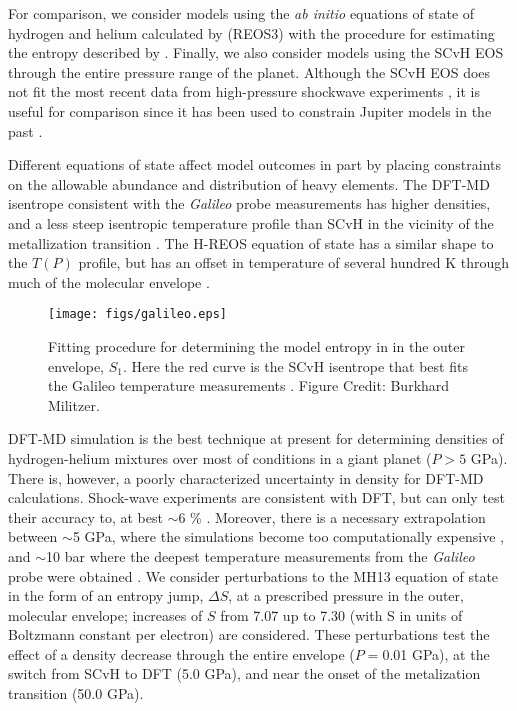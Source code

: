 For comparison, we consider  models using the \textit{ab initio} equations of
state of hydrogen and helium calculated by \citet{becker2013}(REOS3) with the
procedure for estimating the entropy described by \citet{miguel2016}. Finally,
we also consider models using the SCvH EOS through the entire pressure range of
the planet.  Although the SCvH EOS does not fit the most recent data from
high-pressure shockwave experiments \citep{hubbard2016,miguel2016}, it is 
useful for comparison since it has been used to constrain Jupiter models
in the past \citep[e.g.][]{Saumon2004}.  

Different equations of state affect model outcomes in part by placing
constraints on the allowable abundance and distribution of heavy elements. The
DFT-MD isentrope consistent with the \textit{Galileo} probe measurements has
higher densities, and a less steep isentropic temperature profile than SCvH in
the vicinity of the metallization transition
\citep{militzer2013a,militzer2016}. The H-REOS equation of state has a similar
shape to the $T(P)$ profile, but has an offset in temperature of several
hundred K through much of the molecular envelope
\citep{Nettelmann2012,hubbard2016,miguel2016}. 

\begin{figure}[h]
  \begin{center}
    \noindent\texttt{[image: figs/galileo.eps]}
  \end{center}
  \caption{ Fitting procedure for determining the model entropy in in the outer
      envelope, $S_1$. Here the red curve is the SCvH isentrope that best fits the 
      Galileo temperature measurements \citep{Seiff1997}. Figure Credit: Burkhard
      Militzer.
    \label{fig:galileo_match}} 
  \label{fig:galileo}
\end{figure}


DFT-MD simulation is the best technique at present for determining
densities of hydrogen-helium mixtures over most of conditions in a giant planet
($P>5$ GPa).  There is, however, a poorly characterized uncertainty in density
for DFT-MD calculations. Shock-wave experiments are consistent with DFT, but
can only test their accuracy to, at best $\sim$6 \%
\citep{Knudson2004,Brygoo2015}.  Moreover, there is a necessary extrapolation
between $\sim$5 GPa, where the simulations become too computationally expensive
\citep{militzer2013a,militzer2013b}, and $\sim$10 bar where the deepest
temperature measurements from the \textit{Galileo} probe were obtained
\citep{Seiff1997}.  We consider perturbations to the MH13 equation of state in
the form of an entropy jump, $\Delta S$, at a prescribed pressure in the outer,
molecular envelope; increases of $S$ from 7.07 up to 7.30 (with S in units of
Boltzmann constant per electron) are considered. These perturbations test the
effect of a density decrease through the entire envelope ($P=$0.01 GPa), at the
switch from SCvH to DFT (5.0 GPa), and near the onset of the metalization
transition (50.0 GPa). 


